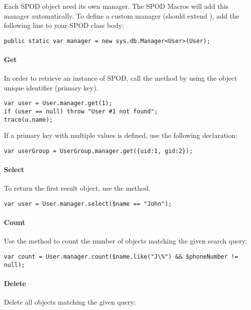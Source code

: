 Each SPOD object need its own manager. The SPOD Macros will add this manager automatically. To define a custom manager (should extend ), add the following line to your SPOD class body:

\begin{lstlisting} 
public static var manager = new sys.db.Manager<User>(User);
\end{lstlisting} 


\paragraph{Get}

In order to retrieve an instance of SPOD, call the  method by using the object unique identifier (primary key).

\begin{lstlisting} 
var user = User.manager.get(1);
if (user == null) throw "User #1 not found";
trace(u.name);
\end{lstlisting} 

If a primary key with multiple values is defined, use the following declaration:

\begin{lstlisting} 
var userGroup = UserGroup.manager.get({uid:1, gid:2});
\end{lstlisting} 


\paragraph{Select}
To return the first result object, use the  method.

\begin{lstlisting} 
var user = User.manager.select($name == "John");
\end{lstlisting} 

\paragraph{Count}
Use the  method to count the number of objects matching the given search query:

\begin{lstlisting} 
var count = User.manager.count($name.like("J\%") && $phoneNumber != null);
\end{lstlisting} 

\paragraph{Delete}
Delete all objects matching the given query:

